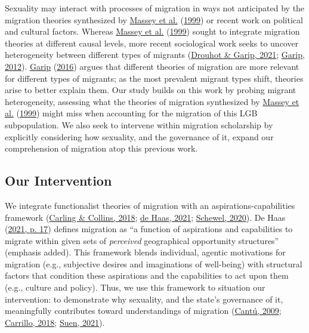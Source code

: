 \documentclass[
  11pt,
]{article}
\begin{document}
Sexuality may interact with processes of migration in ways not anticipated by the migration theories synthesized by \protect\hyperlink{ref-massey_1999}{Massey et al.} (\protect\hyperlink{ref-massey_1999}{1999}) or recent work on political and cultural factors. Whereas \protect\hyperlink{ref-massey_1999}{Massey et al.} (\protect\hyperlink{ref-massey_1999}{1999}) sought to integrate migration theories at different causal levels, more recent sociological work seeks to uncover heterogeneity between different types of migrants (\protect\hyperlink{ref-drouhot_2021_what}{Drouhot \& Garip, 2021}; \protect\hyperlink{ref-garip_2012}{Garip, 2012}). \protect\hyperlink{ref-garip_2016}{Garip} (\protect\hyperlink{ref-garip_2016}{2016}) argues that different theories of migration are more relevant for different types of migrants; as the most prevalent migrant types shift, theories arise to better explain them. Our study builds on this work by probing migrant heterogeneity, assessing what the theories of migration synthesized by \protect\hyperlink{ref-massey_1999}{Massey et al.} (\protect\hyperlink{ref-massey_1999}{1999}) might miss when accounting for the migration of this LGB subpopulation. We also seek to intervene within migration scholarship by explicitly considering how sexuality, and the governance of it, expand our comprehension of migration atop this previous work.

\hypertarget{our-intervention}{%
\subsection{Our Intervention}\label{our-intervention}}

We integrate functionalist theories of migration with an aspirations-capabilities framework (\protect\hyperlink{ref-carling_2018_aspiration}{Carling \& Collins, 2018}; \protect\hyperlink{ref-dehaas_2021}{de Haas, 2021}; \protect\hyperlink{ref-schewel_2020}{Schewel, 2020}). De Haas (\protect\hyperlink{ref-dehaas_2021}{2021, p. 17}) defines migration as ``a function of aspirations and capabilities to migrate within given sets of \emph{perceived} geographical opportunity structures'' (emphasis added). This framework blends individual, agentic motivations for migration (e.g., subjective desires and imaginations of well-being) with structural factors that condition these aspirations and the capabilities to act upon them (e.g., culture and policy). Thus, we use this framework to situation our intervention: to demonstrate why sexuality, and the state's governance of it, meaningfully contributes toward understandings of migration (\protect\hyperlink{ref-cantu_2009}{Cantú, 2009}; \protect\hyperlink{ref-carrillo_2018}{Carrillo, 2018}; \protect\hyperlink{ref-suen_2021_sexual}{Suen, 2021}).
\end{document}
